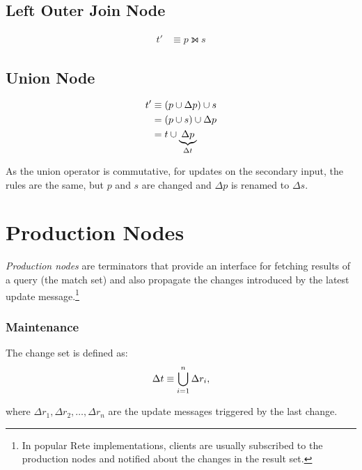\subsection{Left Outer Join Node}

\begin{align*}
	t' & \equiv p \leftouterjoin s
\end{align*}


\subsection{Union Node}

\begin{align*}
	t' & \equiv (p \cup \Delta p) \cup s \\
	   & = (p \cup s) \cup \Delta p \\
	   & = t \cup \underbrace{\Delta p}_{\Delta t}
\end{align*}

As the union operator is commutative, for updates on the secondary input, the rules are the same, but $p$ and $s$ are changed and $\Delta p$ is renamed to $\Delta s$.

\section{Production Nodes}
\label{sec:production-node}

\emph{Production nodes} are terminators that provide an interface for fetching results of a query (the match set) and also propagate the changes introduced by the latest update message.\footnote{In popular Rete implementations, clients are usually subscribed to the production nodes and notified about the changes in the result set.}

\subsubsection{Maintenance}

The change set is defined as:
$$\Delta t \equiv \bigcup_{i=1}^{n} \Delta r_i,$$

where $\Delta r_1, \Delta r_2, \ldots, \Delta r_n$ are the update messages triggered by the last change.
